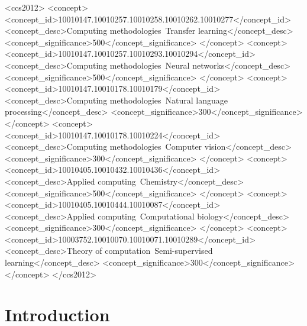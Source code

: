 \documentclass[sigconf]{acmart}
\begin{document}
\begin{CCSXML}
<ccs2012>
<concept>
<concept_id>10010147.10010257.10010258.10010262.10010277</concept_id>
<concept_desc>Computing methodologies~Transfer learning</concept_desc>
<concept_significance>500</concept_significance>
</concept>
<concept>
<concept_id>10010147.10010257.10010293.10010294</concept_id>
<concept_desc>Computing methodologies~Neural networks</concept_desc>
<concept_significance>500</concept_significance>
</concept>
<concept>
<concept_id>10010147.10010178.10010179</concept_id>
<concept_desc>Computing methodologies~Natural language processing</concept_desc>
<concept_significance>300</concept_significance>
</concept>
<concept>
<concept_id>10010147.10010178.10010224</concept_id>
<concept_desc>Computing methodologies~Computer vision</concept_desc>
<concept_significance>300</concept_significance>
</concept>
<concept>
<concept_id>10010405.10010432.10010436</concept_id>
<concept_desc>Applied computing~Chemistry</concept_desc>
<concept_significance>500</concept_significance>
</concept>
<concept>
<concept_id>10010405.10010444.10010087</concept_id>
<concept_desc>Applied computing~Computational biology</concept_desc>
<concept_significance>300</concept_significance>
</concept>
<concept>
<concept_id>10003752.10010070.10010071.10010289</concept_id>
<concept_desc>Theory of computation~Semi-supervised learning</concept_desc>
<concept_significance>300</concept_significance>
</concept>
</ccs2012>
\end{CCSXML}



\maketitle

\section{Introduction}
\label{sec:intro}
\end{document}
